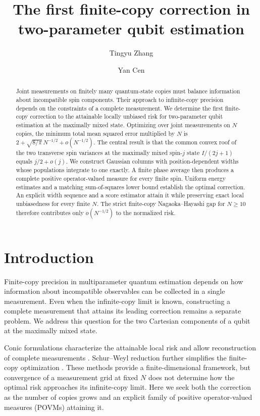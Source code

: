 \documentclass[aps,pra,reprint,superscriptaddress,longbibliography]{revtex4-2}
\theoremstyle{remark}
\begin{document}
\title{The first finite-copy correction in two-parameter qubit estimation}
\author{Tingyu Zhang}
\author{Yan Cen}
\date[]{}
\begin{abstract}
Joint measurements on finitely many quantum-state copies must balance
information about incompatible spin components. Their approach to
infinite-copy precision depends on the constraints of a complete measurement.
We determine the first finite-copy correction to the attainable locally
unbiased risk for two-parameter qubit estimation at the maximally mixed
state. Optimizing over joint measurements on $N$ copies, the minimum total
mean squared error multiplied by $N$ is
$2+\sqrt{8/\pi}\,N^{-1/2}+o(N^{-1/2})$.
The central result is that the common convex roof of the two transverse
spin variances at the maximally mixed spin-$j$ state $I/(2j+1)$ equals $j/2+o(j)$.
We construct Gaussian columns with position-dependent widths whose
populations integrate to one exactly. A finite phase average then produces
a complete positive operator-valued measure for every finite spin.
Uniform energy estimates and a matching sum-of-squares lower bound
establish the optimal correction. An explicit width sequence and a score
estimator attain it while preserving exact local unbiasedness for every
finite $N$. The strict finite-copy Nagaoka--Hayashi gap for $N\geq10$
therefore contributes only $o(N^{-1/2})$ to the normalized risk.
\end{abstract}
\maketitle

\section{Introduction}\label{sec:introduction}

Finite-copy precision in multiparameter quantum estimation depends on
how information about incompatible observables can be collected in a
single measurement. Even when the infinite-copy limit is known,
constructing a complete measurement that attains its leading correction
remains a separate problem. We address this question for the two Cartesian
components of a qubit at the maximally mixed state.

Conic formulations characterize the attainable local risk and allow
reconstruction of complete measurements \cite{HayashiOuyang2023}.
Schur--Weyl reduction further simplifies the finite-copy optimization
\cite{ZhangHayashi2026}. These methods provide a finite-dimensional
framework, but convergence of a measurement grid at fixed $N$ does not
determine how the optimal risk approaches its infinite-copy limit.
Here we seek both the correction as the number of copies grows and an
explicit family of positive operator-valued measures (POVMs) attaining it.
\end{document}
